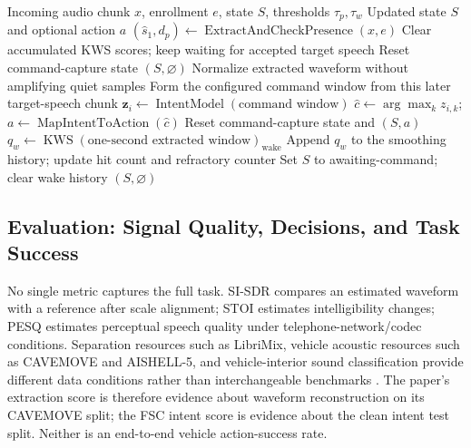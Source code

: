 \begin{algorithm}[H]
  \caption{Streaming inference from target enrollment to an intent action}
  \label{alg:full-pipeline}
  \begin{algorithmic}[1]
    \Require Incoming audio chunk $x$, enrollment $e$, state $S$, thresholds $\tau_p,\tau_w$
    \Ensure Updated state $S$ and optional action $a$
    \State $(\hat{s}_1,d_p)\gets\operatorname{ExtractAndCheckPresence}(x,e)$
      \State Clear accumulated KWS scores; keep waiting for accepted target speech
        \State Reset command-capture state
      \EndIf
      \State \Return $(S,\varnothing)$
    \EndIf
    \State Normalize extracted waveform without amplifying quiet samples
      \State Form the configured command window from this later target-speech chunk
      \State $\mathbf{z}_{i}\gets\operatorname{IntentModel}(\text{command window})$
      \State $\hat{c}\gets\arg\max_k z_{i,k}$; $a\gets\operatorname{MapIntentToAction}(\hat{c})$
      \State Reset command-capture state and \Return $(S,a)$
    \EndIf
    \State $q_w\gets\operatorname{KWS}(\text{one-second extracted window})_{\mathrm{wake}}$
    \State Append $q_w$ to the smoothing history; update hit count and refractory counter
      \State Set $S$ to awaiting-command; clear wake history
    \EndIf
    \State \Return $(S,\varnothing)$
  \end{algorithmic}
\end{algorithm}

\subsection{Evaluation: Signal Quality, Decisions, and Task Success}
\label{subsec:evaluation}

No single metric captures the full task. SI-SDR compares an estimated waveform with a reference after scale alignment; STOI estimates intelligibility changes; PESQ estimates perceptual speech quality under telephone-network/codec conditions. Separation resources such as LibriMix, vehicle acoustic resources such as CAVEMOVE and AISHELL-5, and vehicle-interior sound classification provide different data conditions rather than interchangeable benchmarks \cite{leroux2019sdr,taal2011stoi,pesq2001,librimix,cavemove,aishell5,visdataset,spexplus}. The paper's extraction score is therefore evidence about waveform reconstruction on its CAVEMOVE split; the FSC intent score is evidence about the clean intent test split. Neither is an end-to-end vehicle action-success rate.

